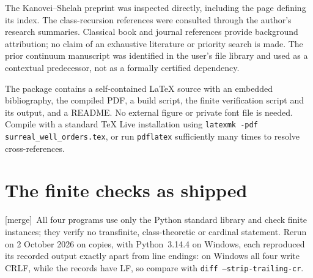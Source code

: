 \documentclass[11pt]{article}
\theoremstyle{definition}
\theoremstyle{remark}
\newcommand{\code}[1]{\texttt{\small #1}}
\newcommand{\merge}{\textsf{[merge]}}
\begin{document}
The Kanovei--Shelah preprint was inspected directly, including the
page defining its index. The class-recursion references were consulted
through the author's research summaries. Classical book and journal
references provide background attribution; no claim of an exhaustive
literature or priority search is made. The prior continuum manuscript
was identified in the user's file library and used as a contextual
predecessor, not as a formally certified dependency.

The package contains a self-contained \LaTeX{} source with an embedded
bibliography, the compiled PDF, a build script, the finite verification
script and its output, and a README. No external figure or private font
file is needed. Compile with a standard TeX Live installation using
\texttt{latexmk -pdf surreal\_well\_orders.tex}, or run
\texttt{pdflatex} sufficiently many times to resolve cross-references.

\section{The finite checks as shipped}\label{swo:app:checks}

\merge\ All four programs use only the Python standard library and check
finite instances; they verify no transfinite, class-theoretic or cardinal
statement. Rerun on 2 October 2026 on copies, with Python~3.14.4 on Windows,
each reproduced its recorded output exactly apart from line endings: on
Windows all four write CRLF, while the records have LF, so compare with
\code{diff --strip-trailing-cr}.
\end{document}
